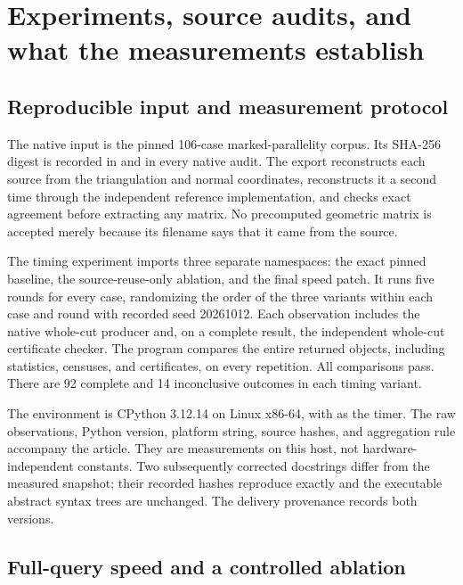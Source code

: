 \section{Experiments, source audits, and what the measurements establish}
\label{sec:experiments}

\subsection{Reproducible input and measurement protocol}

The native input is the pinned 106-case marked-parallelity corpus.  Its
SHA-256 digest is recorded in  and in every native
audit.  The export reconstructs each source from the triangulation and
normal coordinates, reconstructs it a second time through the independent
reference implementation, and checks exact agreement before extracting
any matrix.  No precomputed geometric matrix is accepted merely because
its filename says that it came from the source.

The timing experiment imports three separate namespaces: the exact pinned
baseline, the source-reuse-only ablation, and the final speed patch.  It runs
five rounds for every case, randomizing the order of the three variants
within each case and round with recorded seed 20261012.  Each observation
includes the native whole-cut producer and, on a complete result, the
independent whole-cut certificate checker.  The program compares the
entire returned objects, including statistics, censuses, and certificates,
on every repetition.  All comparisons pass.  There are 92 complete and
14 inconclusive outcomes in each timing variant.

The environment is CPython 3.12.14 on Linux x86-64, with
 as the timer.  The raw observations, Python version,
platform string, source hashes, and aggregation rule accompany the article.
They are measurements on this host, not hardware-independent constants.
Two subsequently corrected docstrings differ from the measured snapshot;
their recorded hashes reproduce exactly and the executable abstract syntax
trees are unchanged.  The delivery provenance records both versions.

\subsection{Full-query speed and a controlled ablation}


